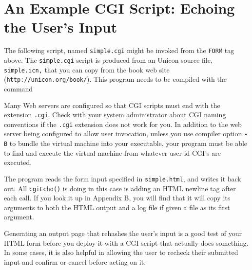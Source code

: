 {\section{An Example CGI Script: Echoing the User's Input}

The following script, named \texttt{simple.cgi} might be invoked from
the \texttt{FORM} tag above. The \texttt{simple.cgi} script is produced
from an Unicon source file, \texttt{simple.icn}\texttt{,} that you can
copy from the book web site
(\texttt{http://unicon.org/book/}). This program needs to
be compiled with the command


Many Web servers are configured so that CGI scripts must end with the
extension \texttt{.cgi}. Check with your system administrator about CGI
naming conventions if the \texttt{.cgi} extension does not work for
you. In addition to the web server being configured to allow user
invocation, unless you use compiler option \texttt{{}-B} to bundle the
virtual machine into your executable, your program must be able to find
and execute the virtual machine from whatever user id
CGI's are executed.

The program reads the form input specified in \texttt{simple.html}, and
writes it back out. All \texttt{cgiEcho()} is doing in this case is
adding an HTML newline tag after each call. If you look it up in
Appendix B, you will find that it will copy its arguments to both the
HTML output and a log file if given a file as its first argument.


Generating an output page that rehashes the user's
input is a good test of your HTML form before you deploy it with a CGI
script that actually does something. In some cases, it is also helpful
in allowing the user to recheck their submitted input and confirm or
cancel before acting on it.

}
